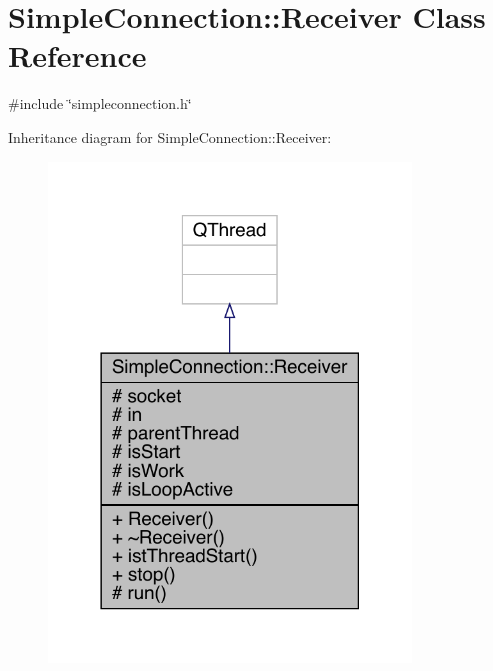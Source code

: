\hypertarget{a00133}{}\section{Simple\+Connection\+:\+:Receiver Class Reference}
\label{a00133}


{\ttfamily \#include \char`\"{}simpleconnection.\+h\char`\"{}}



Inheritance diagram for Simple\+Connection\+:\+:Receiver\+:
\nopagebreak
\begin{figure}[H]
\begin{center}
\leavevmode
\includegraphics[width=273pt]{d5/deb/a00132}
\end{center}
\end{figure}


